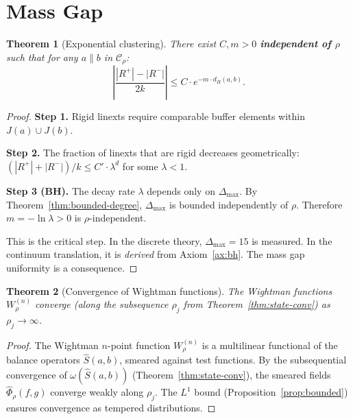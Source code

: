 \documentclass[11pt]{article}
\newtheorem{theorem}{Theorem}[section]
\begin{document}
\section{Mass Gap}
\label{sec:gap}

\begin{theorem}[Exponential clustering]
\label{thm:cluster}
There exist $C, m > 0$ \textbf{independent of $\rho$} such
that for any $a \parallel b$ in $\mathcal{C}_\rho$:
\[
  \left|\frac{|R^+| - |R^-|}{2k}\right|
  \le C \cdot e^{-m \cdot d_H(a,b)}.
\]
\end{theorem}

\begin{proof}
\textbf{Step 1.} Rigid linexts require comparable buffer
elements within $J(a) \cup J(b)$.

\textbf{Step 2.} The fraction of linexts that are rigid
decreases geometrically:
$(|R^+| + |R^-|)/k \le C' \cdot \lambda^d$
for some $\lambda < 1$.

\textbf{Step 3 (BH).} The decay rate $\lambda$ depends only
on $\Delta_{\max}$.  By Theorem~\ref{thm:bounded-degree},
$\Delta_{\max}$ is bounded independently of $\rho$.  Therefore
$m = -\ln\lambda > 0$ is $\rho$-independent.

This is the critical step.  In the discrete theory,
$\Delta_{\max} = 15$ is measured.  In the continuum
translation, it is \emph{derived} from Axiom~\ref{ax:bh}.
The mass gap uniformity is a consequence.
\end{proof}

\begin{theorem}[Convergence of Wightman functions]
\label{thm:convergence}
The Wightman functions $W^{(n)}_\rho$ converge (along the
subsequence $\rho_j$ from Theorem~\ref{thm:state-conv})
as $\rho_j \to \infty$.
\end{theorem}

\begin{proof}
The Wightman $n$-point function $W^{(n)}_\rho$ is a
multilinear functional of the balance operators
$\hat{S}(a,b)$, smeared against test functions.
By the subsequential convergence of
$\omega(\hat{S}(a,b))$ (Theorem~\ref{thm:state-conv}),
the smeared fields $\hat{\Phi}_\rho(f,g)$ converge weakly
along $\rho_j$.  The $L^1$ bound
(Proposition~\ref{prop:bounded}) ensures convergence as
tempered distributions.
\end{proof}
\end{document}
